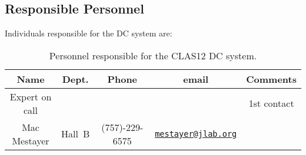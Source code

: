 \subsection{Responsible Personnel}

Individuals responsible for the DC system are:

\begin{table}[!htb]
\centering
\begin{tabular}{|c|c|c|c|c|} \hline
Name &Dept.&Phone&email&Comments \\ \hline
Expert on call &       &       &       & 1st contact \\ \hline
Mac Mestayer&Hall~B&(757)-229-6575& \href{mailto:mestayer@jlab.org}{\nolinkurl{mestayer@jlab.org}} & \\ \hline
 \end{tabular}
\caption{Personnel responsible for the CLAS12 DC system.} 
\label{tb:dc}
\end{table}

